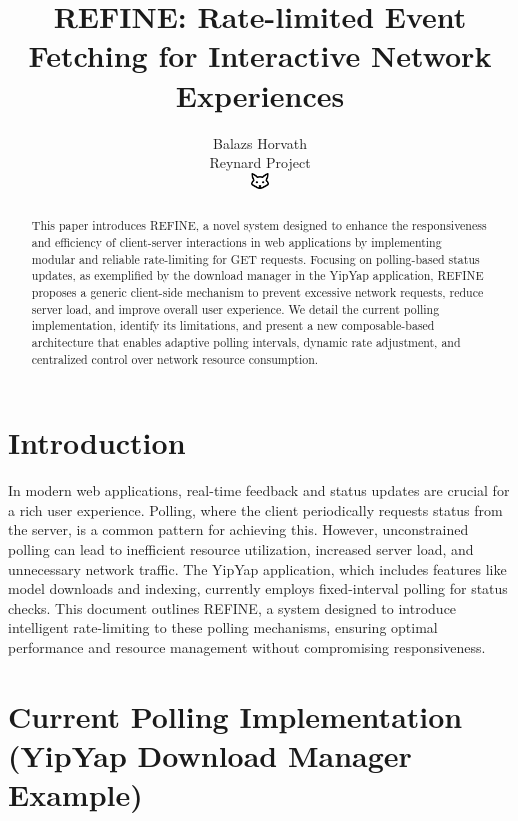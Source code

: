\documentclass[10pt]{article}
\begin{document}
\title{REFINE: Rate-limited Event Fetching for Interactive Network Experiences}

\author{Balazs Horvath\\
Reynard Project\\
\includegraphics[width=0.5cm]{../../shared-assets/favicon.pdf}}

\maketitle

\begin{abstract}
This paper introduces REFINE, a novel system designed to enhance the responsiveness and efficiency of client-server interactions in web applications by implementing modular and reliable rate-limiting for GET requests. Focusing on polling-based status updates, as exemplified by the download manager in the YipYap application, REFINE proposes a generic client-side mechanism to prevent excessive network requests, reduce server load, and improve overall user experience. We detail the current polling implementation, identify its limitations, and present a new composable-based architecture that enables adaptive polling intervals, dynamic rate adjustment, and centralized control over network resource consumption.
\end{abstract}

\section{Introduction}

In modern web applications, real-time feedback and status updates are crucial for a rich user experience. Polling, where the client periodically requests status from the server, is a common pattern for achieving this. However, unconstrained polling can lead to inefficient resource utilization, increased server load, and unnecessary network traffic. The YipYap application, which includes features like model downloads and indexing, currently employs fixed-interval polling for status checks. This document outlines REFINE, a system designed to introduce intelligent rate-limiting to these polling mechanisms, ensuring optimal performance and resource management without compromising responsiveness.

\section{Current Polling Implementation (YipYap Download Manager Example)}
\end{document}
